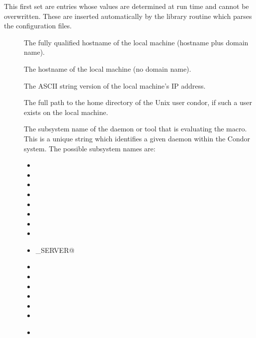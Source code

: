 This first set are entries whose values are determined at
run time and cannot be overwritten.  These are inserted automatically by
the library routine which parses the configuration files.
\begin{description}
  
\item[] \label{param:FullHostname}
  The
  fully qualified hostname of the local machine (hostname plus domain
  name).
  
\item[] \label{param:Hostname}
  The hostname of the local machine (no domain name).
  
\item[] \label{param:IpAddress}
  The ASCII string version of the local machine's IP address.

\item[] \label{param:Tilde}
  The full path to the
  home directory of the Unix user condor, if such a user exists on the
  local machine.

  \label{sec:Condor-Subsystem-Names}
\item[] \label{param:Subsystem}
  The subsystem
  name of the daemon or tool that is evaluating the macro.
  This is a unique string which identifies a given daemon within the
  Condor system.  The possible subsystem names are:

  \begin{itemize}
  \item \verb@STARTD@
  \item \verb@SCHEDD@
  \item \verb@MASTER@
  \item \verb@COLLECTOR@
  \item \verb@NEGOTIATOR@
  \item \verb@KBDD@ 
  \item \verb@SHADOW@
  \item \verb@STARTER@
  \item \verb@CKPT_SERVER@
  \item \verb@SUBMIT@
  \item \verb@GRIDMANAGER@
  \item \verb@TOOL@
  \item \verb@HAD@
  \item \verb@REPLICATION@
  \item \verb@QUILL@
  \item \verb@DBMSD@
    \label{list:subsystem names}
  \end{itemize}

\end{description}

